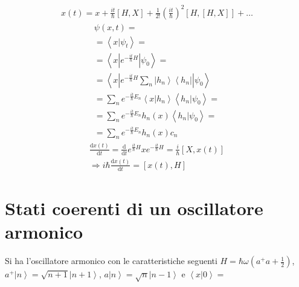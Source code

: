 \begin{equation}\begin{split}
x\left(t\right)=x+\frac{it}{\hbar }\left[H,X\right]+\frac{1}{2!}\left(\frac{it}{\hbar }\right)^2\left[H,\left[H,X\right]\right]+\dots
\end{split}\end{equation}
\begin{equation}\begin{split}
\psi \left(x,t\right)=\\
=\left\langle x|\psi _t \right\rangle=\\
=\left\langle x|e^{-\frac{it}{\hbar }H}|\psi _0 \right\rangle=\\
=\left\langle x|e^{-\frac{it}{\hbar }H}\sum_n{\left |h_n \right\rangle\left\langle h_n\right |}|\psi _0 \right\rangle\\
=\sum_n{e^{-\frac{it}{\hbar }E_n}\left\langle x|h_n \right\rangle\left\langle h_n|\psi _0 \right\rangle}=\\
=\sum_n{e^{-\frac{it}{\hbar }E_n}h_n\left(x\right)\left\langle h_n|\psi _0 \right\rangle}=\\
=\sum_n{e^{-\frac{it}{\hbar }E_n}h_n\left(x\right)c_n}
\end{split}\end{equation}
\begin{equation}\begin{split}
\frac{\textrm{d}x\left(t\right)}{\textrm{d}t}=\frac{\textrm{d}}{\textrm{d}t}e^{\frac{it}{\hbar }H}xe^{-\frac{it}{\hbar }H}=\frac{i}{\hbar }\left[X,x\left(t\right)\right] \\
\Longrightarrow i\hbar \frac{\textrm{d}x\left(t\right)}{\textrm{d}t}=\left[x\left(t\right),H\right]
\end{split}\end{equation}

\section{Stati coerenti di un oscillatore armonico} %
Si ha l'oscillatore armonico con le caratteristiche seguenti $H=\hbar \omega \left(a^+a+\frac{1}{2}\right)$, $a^+\left |n \right\rangle=\sqrt{n+1}\left |n+1 \right\rangle$, $a\left |n \right\rangle=\sqrt{n}\left |n-1 \right\rangle$ e $\left\langle x|0 \right\rangle=$

